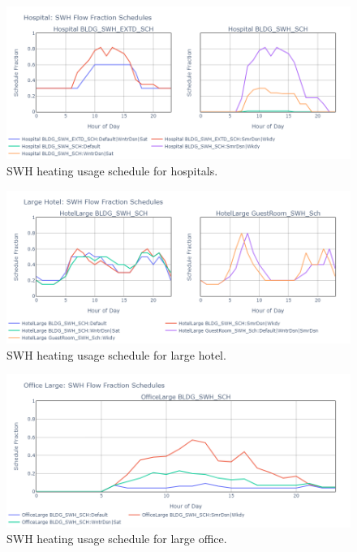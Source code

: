 \begin{figure}
  \centering
  \includegraphics[width=\textwidth]{figures/swh_sched_hospital.png}
  \caption[SWH heating usage schedule for hospitals]{SWH heating usage schedule for hospitals.}
  \label{fig:swh_sched_hos}
\end{figure}

\begin{figure}
  \centering
  \includegraphics[width=\textwidth]{figures/swh_sched_large hotel.png}
  \caption[SWH heating usage schedule for large hotel]{SWH heating usage schedule for large hotel.}
  \label{fig:swh_sched_large_hotel}
\end{figure}

\begin{figure}
  \centering
  \includegraphics[width=\textwidth]{figures/swh_sched_office large.png}
  \caption[SWH heating usage schedule for large office]{SWH heating usage schedule for large office.}
  \label{fig:swh_sched_large_office}
\end{figure}

